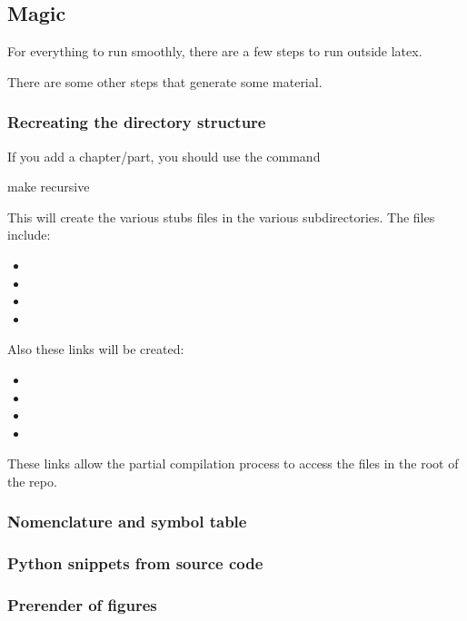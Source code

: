 \subsection{Magic}
For everything to run smoothly, there are a few steps to run outside latex.

There are some other steps that generate some material.

\subsubsection{Recreating the directory structure}

If you add a chapter/part, you should use the command

\begin{console}
    make recursive
\end{console}

This will create the various stubs files in the various subdirectories.
The files include:
\begin{itemize}
    \item {}
    \item {}
    \item {}
    \item {}
\end{itemize}
Also these links will be created:
\begin{itemize}
    \item {}
    \item {}
    \item {}
    \item {}
\end{itemize}
These links allow the partial compilation process to access the files in the root of the repo.

\subsubsection{Nomenclature and symbol table}


\subsubsection{Python snippets from source code}


\subsubsection{Prerender of figures}



